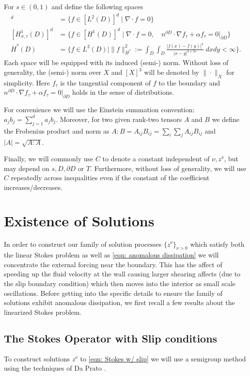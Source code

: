 \documentclass[11pt, reqno]{article}
\def\grad{\nabla}
\begin{document}
For $s \in (0,1)$ and define the following spaces
\begin{align*}
    [L_\sigma^2(D)]^d &= \{f \in [L^2(D)]^d \mid \grad \cdot f = 0\}\\
    [H_{\sigma, \tau}^1(D)]^d &= \{f \in [H^1(D)]^d \mid \grad \cdot f = 0,\quad n^{\partial D}\cdot \grad f_\tau + \alpha f_\tau = 0|_{\partial D}\}\\
    \dot{H}^s(D) &= \{f \in L^2(D) \mid \|f\|_{\dot{H}^s}^2 := \int_D \int_D \frac{|f(x) - f(y)|^2}{|x-y|^{3+2s}}\;dxdy < \infty\}.
\end{align*}
Each space will be equipped with its induced (semi-) norm. Without loss of generality, the (semi-) norm over $X$ and $[X]^3$ will be denoted by $\|\cdot\|_X$ for simplicity. Here $f_\tau$ is the tangential component of $f$ to the boundary and $n^{\partial D} \cdot \grad f_\tau + \alpha f_\tau = 0|_{\partial D}$ holds in the sense of distributions.

For convenience we will use the Einstein summation convention: $a_jb_j = \sum_{j=1}^da_jb_j$. 
Moreover, for two given rank-two tensors $A$ and $B$ we define the Frobenius product and norm as $A:B = A_{ij}B_{ij} = \sum_{i}\sum_j A_{ij}B_{ij}$ and $|A| = \sqrt{A:A}$.

Finally, we will commonly use $C$ to denote a constant independent of $\nu, z^\nu$, but may depend on $s, D, \partial D$ or $T$. Furthermore, without loss of generality, we will use $C$ repeatedly across inequalities even if the constant of the coefficient increases/decreases. 

\section{Existence of Solutions}\label{sec: martingale solutions}
In order to construct our family of solution processes $\{z^\nu\}_{\nu > 0}$ which satisfy both the linear Stokes problem as well as \eqref{eqn: anomalous dissipation} we will concentrate the external forcing near the boundary. This has the affect of speeding up the fluid velocity at the wall causing larger shearing affects (due to the slip boundary condition) which then moves into the interior as small scale oscillations.  Before getting into the specific details to ensure the family of solutions exhibit anomalous dissipation, we first recall a few results about the linearized Stokes problem.

\subsection{The Stokes Operator with Slip conditions}\label{subsec: Stokes operator} 
To construct solutions $z^\nu$ to \eqref{eqn: Stokes w/ slip} we will use a semigroup method using the techniques of Da Prato \cite{da2014stochastic}. \newline
\end{document}
